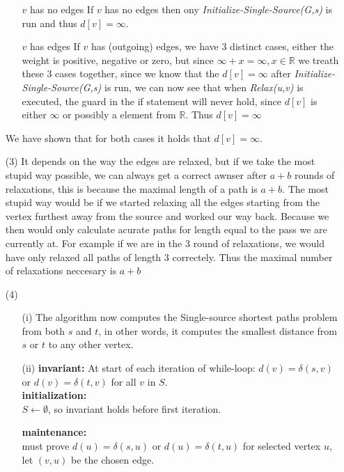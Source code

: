 \documentclass{article}
\begin{document}
\begin{itemize}
\begin{itemize}

\item[$v$ has no edges] If $v$ has no edges then ony \emph{Initialize-Single-Source(G,s)} is run and thus $d[v]=\infty$.
\item[$v$ has edges] If $v$ has (outgoing) edges, we have 3 distinct cases, either the weight is positive, negative or zero, but since $\infty + x= \infty , x \in \mathds{R}$ we treath these 3 cases together, since we know that the $d[v]=\infty$ after \emph{Initialize-Single-Source(G,s)} is run, we can now see that when \emph{Relax(u,v)} is executed, the guard in the if statement will never hold, since $d[v]$ is either $\infty$ or possibly a element from $\mathds{R}$. Thus $d[v]=\infty$

\end{itemize}

We have shown that for both cases it holds that $d[v]=\infty$.

\item[(3)] It depends on the way the edges are relaxed, but if we take the most stupid way possible, we can always get a correct awnser after $a+b$ rounds of relaxations, this is because the maximal length of a path is $a+b$. The most stupid way would be if we started relaxing all the edges starting from the vertex furthest away from the source and worked our way back. Because we then would only calculate acurate paths for length equal to the pass we are currently at. For example if we are in the 3 round of relaxations, we would have only relaxed all paths of length 3 correctely. Thus the maximal number of relaxations neccesary is $a+b$

\item[(4)] \begin{itemize}
\item[(i)] The algorithm now computes the Single-source shortest paths problem from both $s$ and $t$, in other words, it computes the smallest distance from $s$ or $t$ to any other vertex.
\item[(ii)] \textbf{invariant:} At start of each iteration of while-loop: $d(v) = \delta(s,v)$ or $d(v) = \delta(t,v)$  for all $v$ in $S$. \\

\textbf{initialization:} \\
$S\gets \emptyset$, so invariant holds before first iteration.


\textbf{maintenance:} \\
must prove $d(u) =\delta(s,u)$ or $d(u)=\delta(t,u)$ for selected vertex $u$, let $(v,u)$ be the chosen edge.  \\


\end{itemize}
\end{itemize}
\end{document}

